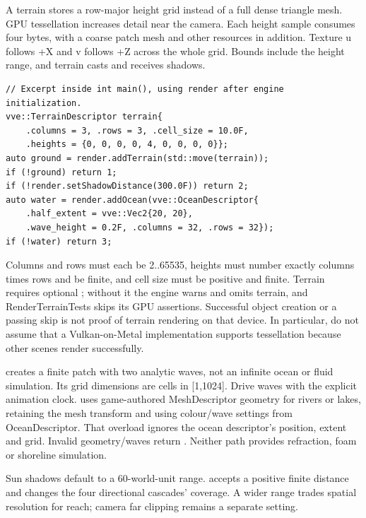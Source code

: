 \documentclass[11pt,a4paper]{article}
\begin{document}

A terrain stores a row-major height grid instead of a full dense triangle mesh. GPU tessellation increases detail near the camera. Each height sample consumes four bytes, with a coarse patch mesh and other resources in addition. Texture u follows +X and v follows +Z across the whole grid. Bounds include the height range, and terrain casts and receives shadows.
\begin{lstlisting}
// Excerpt inside int main(), using render after engine initialization.
vve::TerrainDescriptor terrain{
    .columns = 3, .rows = 3, .cell_size = 10.0F,
    .heights = {0, 0, 0, 0, 4, 0, 0, 0, 0}};
auto ground = render.addTerrain(std::move(terrain));
if (!ground) return 1;
if (!render.setShadowDistance(300.0F)) return 2;
auto water = render.addOcean(vve::OceanDescriptor{
    .half_extent = vve::Vec2{20, 20},
    .wave_height = 0.2F, .columns = 32, .rows = 32});
if (!water) return 3;
\end{lstlisting}
Columns and rows must each be 2..65535, heights must number exactly columns times rows and be finite, and cell size must be positive and finite. Terrain requires optional ; without it the engine warns and omits terrain, and RenderTerrainTests skips its GPU assertions. Successful object creation or a passing skip is not proof of terrain rendering on that device. In particular, do not assume that a Vulkan-on-Metal implementation supports tessellation because other scenes render successfully.

 creates a finite patch with two analytic waves, not an infinite ocean or fluid simulation. Its grid dimensions are cells in [1,1024]. Drive waves with the explicit animation clock.  uses game-authored MeshDescriptor geometry for rivers or lakes, retaining the mesh transform and using colour/wave settings from OceanDescriptor. That overload ignores the ocean descriptor's position, extent and grid. Invalid geometry/waves return . Neither path provides refraction, foam or shoreline simulation.

Sun shadows default to a 60-world-unit range.  accepts a positive finite distance and changes the four directional cascades' coverage. A wider range trades spatial resolution for reach; camera far clipping remains a separate setting.
\end{document}
